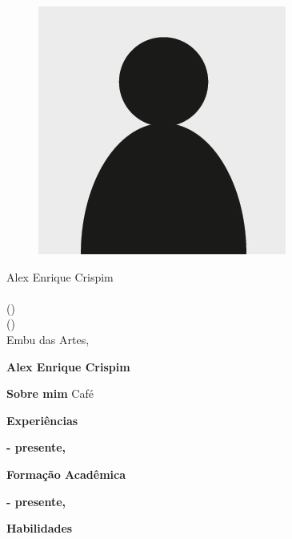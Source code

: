 \documentclass[a4paper,12pt,final]{memoir}
\newcommand{\Sep}{\vspace{1.5em}}
\newcommand{\SmallSep}{\vspace{0.5em}}
\newenvironment{AboutMe}
	{\ignorespaces\textbf{\color{RoyalBlue} Sobre mim}}
	{\Sep\ignorespacesafterend}
\newcommand{\CVSection}[1]
	{\Large\textbf{#1}\par
	\SmallSep\normalsize\normalfont}
\newcommand{\CVItem}[1]
	{\textbf{\color{RoyalBlue} #1}}
\begin{document}
\begin{figure}
	\hfill
	\includegraphics[width=0.6\columnwidth]{cv-photo.png}
	\vspace{-7cm}
\end{figure}

\begin{flushright}\small
	Alex Enrique Crispim\\ 
	\url{}  \\ 
() \\ 
() \\ 
\SmallSep
Embu das Artes, \end{flushright}\normalsize
\framebreak



\Huge\bfseries {\color{RoyalBlue} Alex Enrique Crispim} \\ 

\normalsize\normalfont

\begin{AboutMe}
Café
\end{AboutMe}

\CVSection{Experiências}
\CVItem{ - presente, } \\ 

\Sep

\CVSection{Formação Acadêmica}
\CVItem{ - presente, } \\ 

\Sep


\CVSection{Habilidades}
\CVItem{}
\begin{compactitem}[\color{RoyalBlue}$\circ$]
\item 
\end{compactitem}
\Sep


\end{document}
